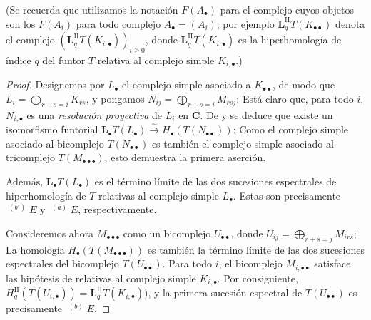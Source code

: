 (Se recuerda que utilizamos la notación $F(A_\bullet)$ para el complejo cuyos objetos son los $F(A_i)$ para todo complejo $A_\bullet=(A_i)$; por ejemplo $\mathbf{L}_q^{\mathrm{II}}T(K_{\bullet\bullet})$ denota el complejo
$(\mathbf{L}_q^{\mathrm{II}}T(K_{i,\bullet}))_{i\geq0}$,
donde $\mathbf{L}_q^{\mathrm{II}}T(K_{i,\bullet})$ es la hiperhomología de índice
$q$ del funtor $T$ relativa al complejo simple $K_{i,\bullet}$.)

\begin{proof}
Designemos por $L_\bullet$ el complejo simple asociado a
$K_{\bullet\bullet}$, de modo que
$L_i=\bigoplus_{r+s=i}K_{rs}$,
y pongamos
$N_{ij}=\bigoplus_{r+s=i}M_{rsj}$;
Está claro que, para todo $i$, $N_{i,\bullet}$ es una \emph{resolución proyectiva}
de $L_i$ en $\boldsymbol{C}$.
De  y  se deduce que existe un
isomorfismo funtorial
$
\mathbf{L}_\bullet T(L_\bullet)\xrightarrow{\sim} H_\bullet(T(N_{\bullet\bullet}))$;
Como el complejo simple asociado al bicomplejo
$T(N_{\bullet\bullet})$ es también el complejo simple asociado al
tricomplejo $T(M_{\bullet\bullet\bullet})$, esto demuestra la primera aserción.

Además, $\mathbf{L}_\bullet T(L_\bullet)$ es el término límite de las dos
sucesiones espectrales de hiperhomología  de $T$ relativas al
complejo simple $L_\bullet$.
Estas son precisamente $\mathop{}^{(b')}E$ y $\mathop{}^{(a)}E$,
respectivamente.

Consideremos ahora $M_{\bullet\bullet\bullet}$ como un bicomplejo
$U_{\bullet\bullet}$, donde
$U_{ij}=\bigoplus_{r+s=j}M_{irs}$;
La homología $H_\bullet(T(M_{\bullet\bullet\bullet}))$ es también la
término límite de las dos sucesiones espectrales del bicomplejo
$T(U_{\bullet\bullet})$.
Para todo $i$, el bicomplejo $M_{i,\bullet\bullet}$ satisface las
hipótesis de  relativas al complejo simple
$K_{i,\bullet}$.
Por consiguiente,
$H_q^{\mathrm{II}}(T(U_{i,\bullet}))=
\mathbf{L}_q^{\mathrm{II}}T(K_{i,\bullet}))$,
y la primera sucesión espectral de $T(U_{\bullet\bullet})$ es precisamente
$\mathop{}^{(b)}E$.


\end{proof}
